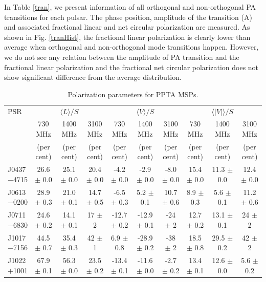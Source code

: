 \documentclass[useAMS,usenatbib]{mn2e}
\begin{document}
In Table \ref{tran}, we present information of all orthogonal and non-orthogonal 
PA transitions for each pulsar.
%
The phase position, amplitude of the transition (A) and associated fractional 
linear and net circular polarization are measured.
%
As shown in Fig. \ref{tranHist}, the fractional linear polarization is clearly 
lower than average when orthogonal and non-orthogonal mode transitions happen.
%
However, we do not see any relation between the amplitude of PA transition and 
the fractional linear polarization and the fractional net circular polarization 
does not show significant difference from the average distribution.
%

\begin{table}
\begin{center}
\caption{Polarization parameters for PPTA MSPs.}
\label{tablePol}
\begin{tabular}{lccccccccc}
\hline
PSR              &                  &    $\langle L \rangle/S$    &                  &               & $\langle V \rangle/S$       &                  &      &      $\langle|V|\rangle/S$       &                      \\
								 &     730 MHz      &          1400 MHz           &    3100 MHz      &  730 MHz      &          1400 MHz           &    3100 MHz      &  730 MHz      &          1400 MHz           &    3100 MHz       \\
								 &     (per cent)   &         (per cent)          &     (per cent)   &    (per cent)   &         (per cent)          &     (per cent)   &   (per cent)   &         (per cent)          &     (per cent)  \\
\hline
J0437$-$4715& 26.6 $\pm$ 0.0& 25.1 $\pm $ 0.0& 20.4 $\pm$ 0.0& -4.2 $\pm$ 0.0 & -2.9 $\pm$ 0.0 & -8.0 $\pm$ 0.0 & 15.4 $\pm$ 0.0 & 11.3 $\pm$ 0.0 & 12.4 $\pm$ 0.0 \\
J0613$-$0200& 28.9 $\pm$ 0.3& 21.0 $\pm $ 0.1& 14.7 $\pm$ 0.5& -6.5 $\pm$ 0.3 & 5.2  $\pm$ 0.1 & 10.7 $\pm$ 0.6 &  8.9 $\pm$ 0.3 &  5.6 $\pm$ 0.1 & 11.2 $\pm$ 0.6 \\
J0711$-$6830& 24.6 $\pm$ 0.2& 14.1 $\pm $ 0.1& 17   $\pm$ 2  &-12.7 $\pm$ 0.2 &-12.9 $\pm$ 0.1 & -24  $\pm$ 2   & 12.7 $\pm$ 0.2 & 13.1 $\pm$ 0.1 & 24   $\pm$ 2 \\
J1017$-$7156& 44.5 $\pm$ 0.7& 35.4 $\pm $ 0.3& 42   $\pm$ 1  &  6.9 $\pm$ 0.8 &-28.9 $\pm$ 0.2 & -38  $\pm$ 2   & 18.5 $\pm$ 0.8 & 29.5 $\pm$ 0.2 & 42   $\pm$ 2 \\
J1022$+$1001& 67.9 $\pm$ 0.1& 56.3 $\pm $ 0.0& 23.5 $\pm$ 0.2&-13.4 $\pm$ 0.1 &-11.6 $\pm$ 0.0 & -2.7 $\pm$ 0.2 & 13.4 $\pm$ 0.1 & 12.6 $\pm$ 0.0 & 5.6  $\pm$ 0.2 \\

\end{tabular}
\end{center}
\end{table}
\end{document}
